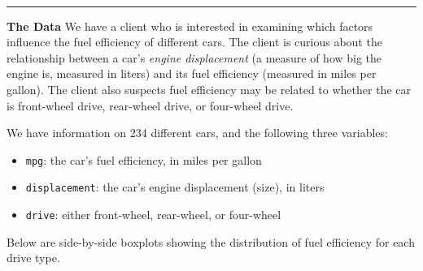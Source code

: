 \documentclass[11pt]{article}
\begin{document}
\begin{titlepage}



\end{titlepage}

\pagebreak

$\:$ \\
\thispagestyle{empty}
\pagebreak

\setcounter{page}{1}

\rule{\textwidth}{0.5pt}

\textbf{The Data} We have a client who is interested in examining which factors influence the fuel efficiency of different cars. The client is curious about the relationship between a car's \textit{engine displacement} (a measure of how big the engine is, measured in liters) and its fuel efficiency (measured in miles per gallon). The client also suspects fuel efficiency may be related to whether the car is front-wheel drive, rear-wheel drive, or four-wheel drive.

We have information on 234 different cars, and the following three variables:

\begin{itemize}
\item \texttt{mpg}: the car's fuel efficiency, in miles per gallon
\item \texttt{displacement}: the car's engine displacement (size), in liters
\item \texttt{drive}: either front-wheel, rear-wheel, or four-wheel
\end{itemize}

Below are side-by-side boxplots showing the distribution of fuel efficiency for each drive type.
\end{document}
